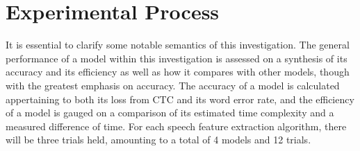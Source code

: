 \section{Experimental Process}

It is essential to clarify some notable semantics of this investigation. The general performance of a model within this investigation is assessed on a synthesis of its accuracy and its efficiency as well as how it compares with other models, though with the greatest emphasis on accuracy. The accuracy of a model is calculated appertaining to both its loss from CTC and its word error rate, and the efficiency of a model is gauged on a comparison of its estimated time complexity and a measured difference of time. For each speech feature extraction algorithm, there will be three trials held, amounting to a total of 4 models and 12 trials. 